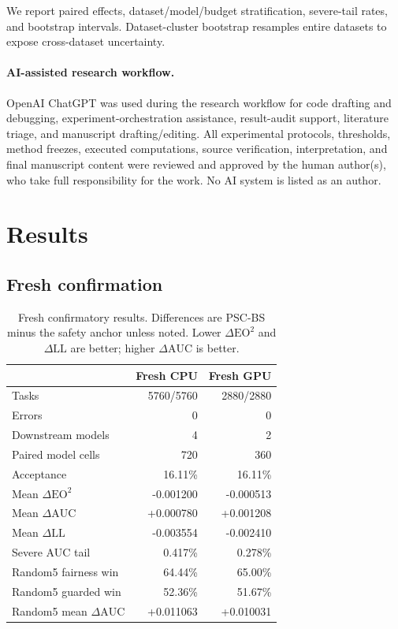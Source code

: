 \documentclass[10pt]{article}
\newcommand{\PSC}{\textsc{PSC-BS}}
\newcommand{\eo}{\mathrm{EO}^2}
\newcommand{\AUC}{\mathrm{AUC}}
\newcommand{\LL}{\mathrm{LL}}
\begin{document}
We report paired effects, dataset/model/budget stratification, severe-tail rates, and bootstrap intervals.
Dataset-cluster bootstrap resamples entire datasets to expose cross-dataset uncertainty.


\paragraph{AI-assisted research workflow.}
OpenAI ChatGPT was used during the research workflow for code drafting and debugging, experiment-orchestration assistance, result-audit support, literature triage, and manuscript drafting/editing.
All experimental protocols, thresholds, method freezes, executed computations, source verification, interpretation, and final manuscript content were reviewed and approved by the human author(s), who take full responsibility for the work.
No AI system is listed as an author.


\section{Results}

\subsection{Fresh confirmation}

\begin{table}[t]
\centering
\caption{Fresh confirmatory results. Differences are \PSC{} minus the safety anchor unless noted. Lower $\Delta\eo$ and $\Delta\LL$ are better; higher $\Delta\AUC$ is better.}
\label{tab:fresh}
\begin{tabular}{lrr}
\toprule
 & Fresh CPU & Fresh GPU \\
\midrule
Tasks & 5760/5760 & 2880/2880 \\
Errors & 0 & 0 \\
Downstream models & 4 & 2 \\
Paired model cells & 720 & 360 \\
Acceptance & 16.11\% & 16.11\% \\
Mean $\Delta\eo$ & -0.001200 & -0.000513 \\
Mean $\Delta\AUC$ & +0.000780 & +0.001208 \\
Mean $\Delta\LL$ & -0.003554 & -0.002410 \\
Severe AUC tail & 0.417\% & 0.278\% \\
Random5 fairness win & 64.44\% & 65.00\% \\
Random5 guarded win & 52.36\% & 51.67\% \\
Random5 mean $\Delta\AUC$ & +0.011063 & +0.010031 \\
\bottomrule
\end{tabular}
\end{table}
\end{document}
